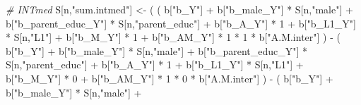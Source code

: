 \documentclass[
]{book}
\newenvironment{Shaded}{\begin{snugshade}}{\end{snugshade}}
\newcommand{\CommentTok}[1]{\textcolor[rgb]{0.56,0.35,0.01}{\textit{#1}}}
\newcommand{\DecValTok}[1]{\textcolor[rgb]{0.00,0.00,0.81}{#1}}
\newcommand{\NormalTok}[1]{#1}
\newcommand{\OtherTok}[1]{\textcolor[rgb]{0.56,0.35,0.01}{#1}}
\newcommand{\SpecialCharTok}[1]{\textcolor[rgb]{0.00,0.00,0.00}{#1}}
\newcommand{\StringTok}[1]{\textcolor[rgb]{0.31,0.60,0.02}{#1}}
\begin{document}
\begin{Shaded}
\begin{Highlighting}[]
    \CommentTok{\# INTmed }
\NormalTok{    S[n,}\StringTok{"sum.intmed"}\NormalTok{] }\OtherTok{\textless{}{-}}\NormalTok{ ( ( b[}\StringTok{"b\_Y"}\NormalTok{] }\SpecialCharTok{+} 
\NormalTok{                               b[}\StringTok{"b\_male\_Y"}\NormalTok{] }\SpecialCharTok{*}\NormalTok{ S[n,}\StringTok{"male"}\NormalTok{] }\SpecialCharTok{+} 
\NormalTok{                               b[}\StringTok{"b\_parent\_educ\_Y"}\NormalTok{] }\SpecialCharTok{*}\NormalTok{ S[n,}\StringTok{"parent\_educ"}\NormalTok{] }\SpecialCharTok{+} 
\NormalTok{                               b[}\StringTok{"b\_A\_Y"}\NormalTok{] }\SpecialCharTok{*} \DecValTok{1} \SpecialCharTok{+} 
\NormalTok{                               b[}\StringTok{"b\_L1\_Y"}\NormalTok{] }\SpecialCharTok{*}\NormalTok{ S[n,}\StringTok{"L1"}\NormalTok{] }\SpecialCharTok{+}
\NormalTok{                               b[}\StringTok{"b\_M\_Y"}\NormalTok{] }\SpecialCharTok{*} \DecValTok{1} \SpecialCharTok{+}
\NormalTok{                               b[}\StringTok{"b\_AM\_Y"}\NormalTok{] }\SpecialCharTok{*} \DecValTok{1} \SpecialCharTok{*} \DecValTok{1} \SpecialCharTok{*}\NormalTok{ b[}\StringTok{"A.M.inter"}\NormalTok{] ) }\SpecialCharTok{{-}} 
\NormalTok{                             ( b[}\StringTok{"b\_Y"}\NormalTok{] }\SpecialCharTok{+} 
\NormalTok{                                 b[}\StringTok{"b\_male\_Y"}\NormalTok{] }\SpecialCharTok{*}\NormalTok{ S[n,}\StringTok{"male"}\NormalTok{] }\SpecialCharTok{+} 
\NormalTok{                                 b[}\StringTok{"b\_parent\_educ\_Y"}\NormalTok{] }\SpecialCharTok{*}\NormalTok{ S[n,}\StringTok{"parent\_educ"}\NormalTok{] }\SpecialCharTok{+} 
\NormalTok{                                 b[}\StringTok{"b\_A\_Y"}\NormalTok{] }\SpecialCharTok{*} \DecValTok{1} \SpecialCharTok{+} 
\NormalTok{                                 b[}\StringTok{"b\_L1\_Y"}\NormalTok{] }\SpecialCharTok{*}\NormalTok{ S[n,}\StringTok{"L1"}\NormalTok{] }\SpecialCharTok{+}
\NormalTok{                                 b[}\StringTok{"b\_M\_Y"}\NormalTok{] }\SpecialCharTok{*} \DecValTok{0} \SpecialCharTok{+}
\NormalTok{                                 b[}\StringTok{"b\_AM\_Y"}\NormalTok{] }\SpecialCharTok{*} \DecValTok{1} \SpecialCharTok{*} \DecValTok{0} \SpecialCharTok{*}\NormalTok{ b[}\StringTok{"A.M.inter"}\NormalTok{] ) }\SpecialCharTok{{-}} 
\NormalTok{                             ( b[}\StringTok{"b\_Y"}\NormalTok{] }\SpecialCharTok{+} 
\NormalTok{                                 b[}\StringTok{"b\_male\_Y"}\NormalTok{] }\SpecialCharTok{*}\NormalTok{ S[n,}\StringTok{"male"}\NormalTok{] }\SpecialCharTok{+} 

\end{Highlighting}
\end{Shaded}
\end{document}
